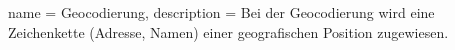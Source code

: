  {
name = Geocodierung,
description = {Bei der Geocodierung wird eine Zeichenkette (Adresse, Namen) einer geografischen Position zugewiesen.}
}


